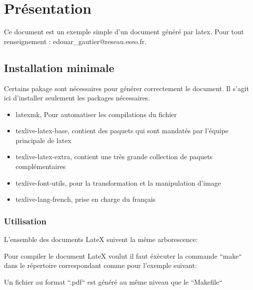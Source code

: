 \section{Présentation}
Ce document est un exemple simple d'un document généré par \gls{latex}. \newline
Pour tout renseignement : edouar\_gautier@reseau.eseo.fr.

\subsection{Installation minimale}
Certains pakage sont nécessaires pour générer correctement le document.
Il s'agit ici d'installer seulement les packages nécessaires.
\begin{itemize}
    \item latexmk, Pour automatiser les compilations du fichier
    \item texlive-latex-base, contient des paquets qui sont mandatés par l'équipe principale de \gls{latex}
    \item texlive-latex-extra, contient une très grande collection de paquets complémentaires
    \item texlive-font-utils, pour la transformation et la manipulation d'image
    \item texlive-lang-french, prise en charge du français
\end{itemize}

\subsubsection{Utilisation}
L'ensemble des documents LateX suivent la même arborescence:

Pour compiler le document LateX voulut il faut éxècuter la commande ``make`` dans le répertoire correspondant comme pour l'exemple suivant:

Un fichier au format ``.pdf`` est généré au même niveau que le ``Makefile``
